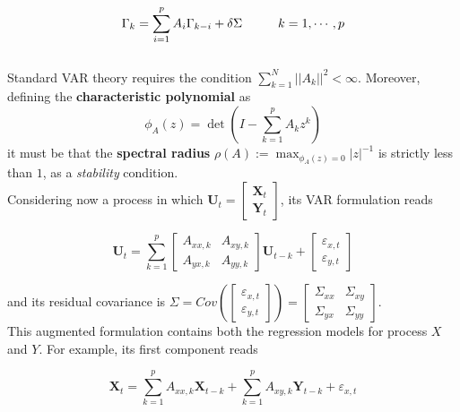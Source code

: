 \documentclass[12pt, a4paper]{report}
\begin{document}
\begin{equation}
\Gamma_k = \sum_{i=1}^{p} A_i \Gamma_{k-i} + \delta \Sigma \hspace{1 cm }  k = 1, \cdots, p \label{Yule-Walker}
\end{equation}\\

Standard VAR theory \cite{21} %
 requires the condition $ \sum_{k=1}^{N}||A_k||^2 < \infty $. Moreover, defining the \textbf{characteristic polynomial} as 
$$ \phi_A(z)= \det \left( I - \sum_{k=1}^{p} A_k z^k \right) $$
it must be that the \textbf{spectral radius} $\rho(A) := \max_{\phi_A(z)=0}|z|^{-1}$ is strictly less than $1$, as a \textit{stability} condition.
\\

Considering now a process in which $ \textbf{U}_t = \begin{bmatrix} \textbf{X}_t  \\  \textbf{Y}_t \end{bmatrix} $, its VAR formulation reads

\begin{equation}
\textbf{U}_t = \sum_{k=1}^{p} \begin{bmatrix} A_{xx,k}  &  A_{xy,k} \\  A_{yx,k}  & A_{yy,k} \end{bmatrix} \textbf{U}_{t-k} + \begin{bmatrix} \varepsilon_{x,t}  \\  \varepsilon_{y,t} \end{bmatrix}
\end{equation}


and its residual covariance is $ \Sigma = Cov\left(\begin{bmatrix} \varepsilon_{x,t}  \\  \varepsilon_{y,t} \end{bmatrix}\right) = \begin{bmatrix} \Sigma_{xx}  &  \Sigma_{xy} \\  \Sigma_{yx}  & \Sigma_{yy} \end{bmatrix} $.\\

This augmented formulation contains both the regression models for process $X$ and $Y$. For example, its first component reads

\begin{equation}
\textbf{X}_t = \sum_{k=1}^{p} A_{xx,k} \textbf{X}_{t-k} + \sum_{k=1}^{p} A_{xy,k}  \textbf{Y}_{t-k} + \varepsilon_{x,t}
\end{equation}
\end{document}
